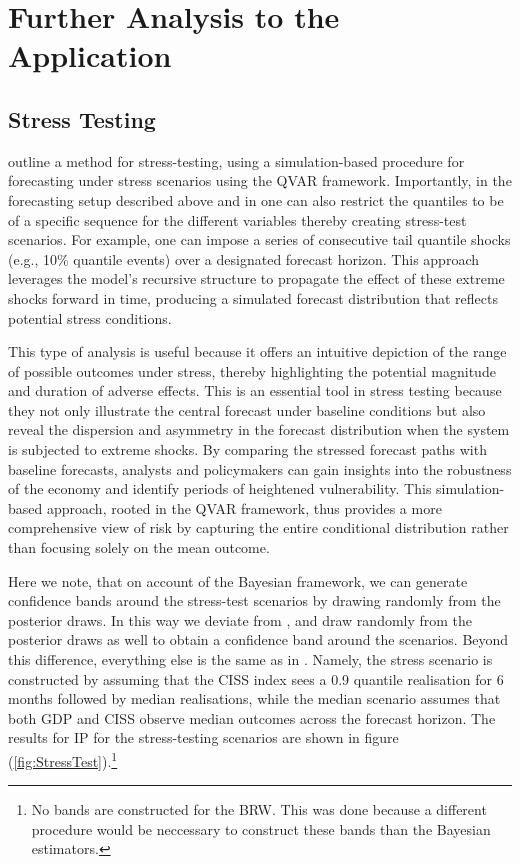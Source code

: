 \clearpage

\section{Further Analysis to the Application}\label{app:extra-results-application}


\subsection{Stress Testing}\label{app:stress-testing}
\citet{chavleishvili2024forecasting} outline a method for stress-testing, using a simulation-based procedure for forecasting under stress scenarios using the QVAR framework. Importantly, in the forecasting setup described above and in \citet{chavleishvili2024forecasting} one can also restrict the quantiles to be of a specific sequence for the different variables thereby creating stress-test scenarios. For example, one can impose a series of consecutive tail quantile shocks (e.g., 10\% quantile events) over a designated forecast horizon. This approach leverages the model’s recursive structure to propagate the effect of these extreme shocks forward in time, producing a simulated forecast distribution that reflects potential stress conditions.

This type of analysis is useful because it offers an intuitive depiction of the range of possible outcomes under stress, thereby highlighting the potential magnitude and duration of adverse effects. This is an essential tool in stress testing because they not only illustrate the central forecast under baseline conditions but also reveal the dispersion and asymmetry in the forecast distribution when the system is subjected to extreme shocks. By comparing the stressed forecast paths with baseline forecasts, analysts and policymakers can gain insights into the robustness of the economy and identify periods of heightened vulnerability. This simulation-based approach, rooted in the QVAR framework, thus provides a more comprehensive view of risk by capturing the entire conditional distribution rather than focusing solely on the mean outcome.

Here we note, that on account of the Bayesian framework, we can generate confidence bands around the stress-test scenarios by drawing randomly from the posterior draws. In this way we deviate from \citet{chavleishvili2024forecasting}, and draw randomly from the posterior draws as well to obtain a confidence band around the scenarios. Beyond this difference, everything else is the same as in \citet{chavleishvili2024forecasting}. Namely, the stress scenario is constructed by assuming that the CISS index sees a 0.9 quantile realisation for 6 months followed by median realisations, while the median scenario assumes that both GDP and CISS observe median outcomes across the forecast horizon. The results for IP for the stress-testing scenarios are shown in figure (\ref{fig:StressTest}).\footnote{No bands are constructed for the BRW. This was done because a different procedure would be neccessary to construct these bands than the Bayesian estimators.}

